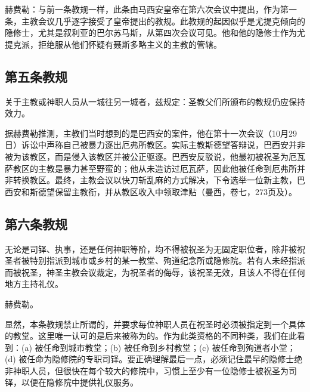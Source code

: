 赫费勒：与前一条教规一样，此条由马西安皇帝在第六次会议中提出，作为第一条，主教会议几乎逐字接受了皇帝提出的教规。此教规的起因似乎是尤提克倾向的隐修士，尤其是叙利亚的巴尔苏马斯，从第四次会议可见。他和他的隐修士作为尤提克派，拒绝服从他们怀疑有聂斯多略主义的主教的管辖。\par


\subsection{第五条教规}

关于主教或神职人员从一城往另一城者，兹规定：圣教父们所颁布的教规仍应保持效力。\par

据赫费勒推测，主教们当时想到的是巴西安的案件，他在第十一次会议（10月29日）诉讼中声称自己被暴力逐出厄弗所教区。实际主教斯德望答辩说，巴西安并非被为该教区，而是侵入该教区并被公正驱逐。巴西安反驳说，他最初被祝圣为厄瓦萨教区的主教是暴力甚至野蛮的；他从未造访过厄瓦萨，因此他被任命到厄弗所并非转换教区。最终，主教会议以快刀斩乱麻的方式解决，下令选举一位新主教，巴西安和斯德望保留主教衔，并从教区收入中领取津贴（曼西，卷七，273页及）。\par


\subsection{第六条教规}

无论是司铎、执事，还是任何神职等阶，均不得被祝圣为无固定职位者，除非被祝圣者被特别指派到城市或乡村的某一教堂、殉道纪念所或隐修院。若有人未经指派而被祝圣，神圣主教会议裁定，为祝圣者的侮辱，该祝圣无效，且该人不得在任何地方主持礼仪。\par

赫费勒。\par

显然，本条教规禁止所谓的，并要求每位神职人员在祝圣时必须被指定到一个具体的教堂。这里唯一认可的是后来被称为的。作为此类资格的不同种类，我们在此看到：(a) 被任命到城市教堂；(b) 被任命到乡村教堂；(c) 被任命到殉道者小堂；(d) 被任命为隐修院的专职司铎。要正确理解最后一点，必须记住最早的隐修士绝非神职人员，但很快在每个较大的修院中，习惯上至少有一位隐修士被祝圣为司铎，以便在隐修院中提供礼仪服务。\par

